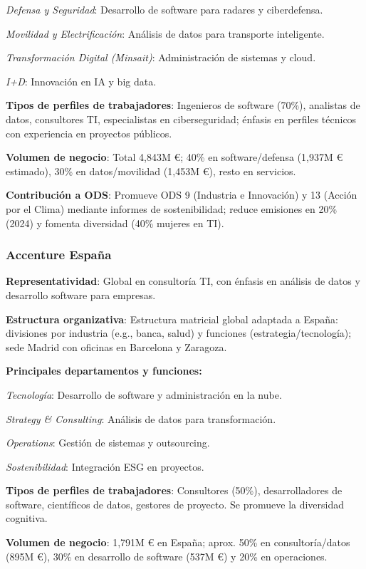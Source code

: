 \documentclass[11.5pt]{article}
\begin{document}
	\textit{Defensa y Seguridad}: Desarrollo de software para radares y ciberdefensa.
	
	\textit{Movilidad y Electrificación}: Análisis de datos para transporte inteligente.
	
	\textit{Transformación Digital (Minsait)}: Administración de sistemas y cloud.
	
	\textit{I+D}: Innovación en IA y big data.
	
	\textbf{Tipos de perfiles de trabajadores}: Ingenieros de software (70\%), analistas de datos, consultores TI,
	especialistas en ciberseguridad; énfasis en perfiles técnicos con experiencia en proyectos públicos.

	\textbf{Volumen de negocio}: Total 4,843M €; 40\% en software/defensa (1,937M € estimado), 30\% en datos/movilidad (1,453M €), resto en servicios.
	
	\textbf{Contribución a ODS}: Promueve ODS 9 (Industria e Innovación) y 13 (Acción por el Clima) mediante informes
	de sostenibilidad; reduce emisiones en 20\% (2024) y fomenta diversidad (40\% mujeres en TI).
	
	\subsubsection{Accenture España}
	
	\textbf{Representatividad}: Global en consultoría TI, con énfasis en análisis de datos y desarrollo software para
	empresas.
	
	\textbf{Estructura organizativa}: Estructura matricial global adaptada a España: divisiones por industria (e.g., banca, salud) y funciones (estrategia/tecnología); sede Madrid con oficinas en Barcelona y Zaragoza.
	
	\textbf{Principales departamentos y funciones:}
	
	\textit{Tecnología}: Desarrollo de software y administración en la nube.
	
	\textit{Strategy \& Consulting}: Análisis de datos para transformación.
	
	\textit{Operations}: Gestión de sistemas y outsourcing.
	
	\textit{Sostenibilidad}: Integración ESG en proyectos.
	
	\textbf{Tipos de perfiles de trabajadores}: Consultores (50\%), desarrolladores de software, científicos de datos,
	gestores de proyecto. Se promueve la diversidad cognitiva.
	
	\textbf{Volumen de negocio}: 1,791M € en España; aprox. 50\% en consultoría/datos (895M €), 30\% en desarrollo de
	software (537M €) y 20\% en operaciones.
	
\end{document}
